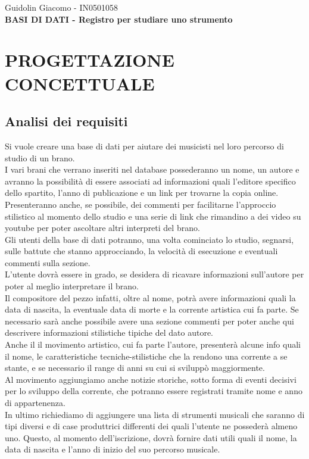 \documentclass{article}
\begin{document}
    Guidolin Giacomo - IN0501058 \\


    \textbf{BASI DI DATI - Registro per studiare uno strumento}\\

    \section{PROGETTAZIONE CONCETTUALE }

    \subsection{Analisi dei requisiti}

    Si vuole creare una base di dati per aiutare dei musicisti nel loro percorso di studio di un brano.\\
    I vari brani che verrano inseriti nel database possederanno un nome, un autore e avranno la possibilità di essere associati ad informazioni quali l'editore specifico dello spartito,
    l'anno di publicazione e un link per trovarne la copia online. Presenteranno anche, se possibile, dei commenti per facilitarne l'approccio stilistico al momento dello studio e una serie
    di link che rimandino a dei video su youtube per poter ascoltare altri interpreti del brano.\\
    Gli utenti della base di dati potranno, una volta cominciato lo studio, segnarsi, sulle battute che stanno approcciando, la velocità di esecuzione e eventuali commenti sulla sezione.\\
    L'utente dovrà essere in grado, se desidera di ricavare informazioni sull'autore per poter al meglio interpretare il brano.\\
    Il compositore del pezzo infatti, oltre al nome, potrà avere informazioni quali la data di nascita, la eventuale data di morte e la corrente artistica cui fa parte. Se necessario sarà anche
    possibile avere una sezione commenti per poter anche qui descrivere informazioni stilistiche tipiche del dato autore.\\
    Anche il il movimento artistico, cui fa parte l'autore, presenterà alcune info quali il nome, le caratteristiche tecniche-stilistiche che la rendono una corrente a se stante,
    e se necessario il range di anni su cui si sviluppò  maggiormente.
    \\Al movimento aggiungiamo anche notizie storiche, sotto forma di eventi decisivi per lo sviluppo della corrente, che potranno essere registrati tramite nome e anno di appartenenza.
    \\In ultimo richiediamo di aggiungere una lista di strumenti musicali che saranno di tipi diversi e di case produttrici differenti dei quali l'utente ne possederà almeno uno. Questo, al
    momento dell'iscrizione, dovrà fornire dati utili quali il nome, la data di nascita e l'anno di inizio del suo percorso musicale.\\
\end{document}
